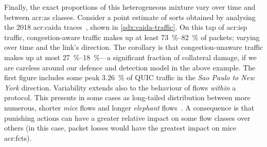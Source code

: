 Finally, the exact proportions of this heterogeneous mixture vary over time and between \gls{acr:as} classes.
Consider a point estimate of sorts obtained by analysing the 2018 \gls{acr:caida} traces~\parencite{caida-2018-passive}, shown in \cref{adx:caida-traffic}.
On this tap of \gls{acr:isp} traffic, congestion-aware traffic makes up at least \qtyrange{73}{82}{\percent} of packets; varying over time and the link's direction.
The corollary is that congestion-unaware traffic makes up at most \qtyrange{27}{18}{\percent}---a significant fraction of collateral damage, if we are careless around our defence and detection model in the above example.
The first figure includes some peak \qty{3.26}{\percent} of QUIC traffic in the \emph{Sao Paulo to New York} direction.
Variability extends also to the behaviour of flows \emph{within} a protocol.
This presents in some cases as long-tailed distribution between more numerous, shorter \emph{mice} flows and longer \emph{elephant} flows~\parencite{DBLP:journals/ccr/PanBPS03}.
A consequence is that punishing actions can have a greater relative impact on some flow classes over others (in this case, packet losses would have the greatest impact on mice \glspl{acr:fct}).


